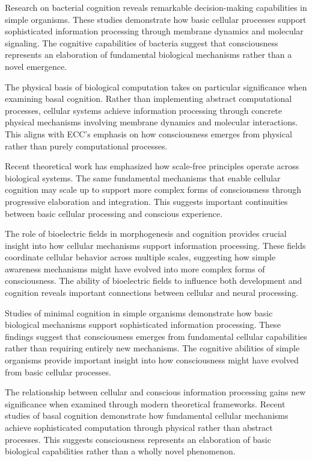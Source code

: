 \begin{refsection}
Research on bacterial cognition \cite{Shapiro2007} reveals remarkable decision-making capabilities in simple organisms. These studies demonstrate how basic cellular processes support sophisticated information processing through membrane dynamics and molecular signaling. The cognitive capabilities of bacteria suggest that consciousness represents an elaboration of fundamental biological mechanisms rather than a novel emergence.

The physical basis of biological computation \cite{Pattee2001} takes on particular significance when examining basal cognition. Rather than implementing abstract computational processes, cellular systems achieve information processing through concrete physical mechanisms involving membrane dynamics and molecular interactions. This aligns with ECC's emphasis on how consciousness emerges from physical rather than purely computational processes.

Recent theoretical work \cite{Fields2020} has emphasized how scale-free principles operate across biological systems. The same fundamental mechanisms that enable cellular cognition may scale up to support more complex forms of consciousness through progressive elaboration and integration. This suggests important continuities between basic cellular processing and conscious experience.

The role of bioelectric fields in morphogenesis and cognition \cite{Levin2019} provides crucial insight into how cellular mechanisms support information processing. These fields coordinate cellular behavior across multiple scales, suggesting how simple awareness mechanisms might have evolved into more complex forms of consciousness. The ability of bioelectric fields to influence both development and cognition reveals important connections between cellular and neural processing.

Studies of minimal cognition in simple organisms \cite{vanDuijn2006} demonstrate how basic biological mechanisms support sophisticated information processing. These findings suggest that consciousness emerges from fundamental cellular capabilities rather than requiring entirely new mechanisms. The cognitive abilities of simple organisms provide important insight into how consciousness might have evolved from basic cellular processes.

The relationship between cellular and conscious information processing \cite{Margulis2001} gains new significance when examined through modern theoretical frameworks. Recent studies of basal cognition \cite{Levin2018} demonstrate how fundamental cellular mechanisms achieve sophisticated computation through physical rather than abstract processes. This suggests consciousness represents an elaboration of basic biological capabilities rather than a wholly novel phenomenon.


\end{refsection}
